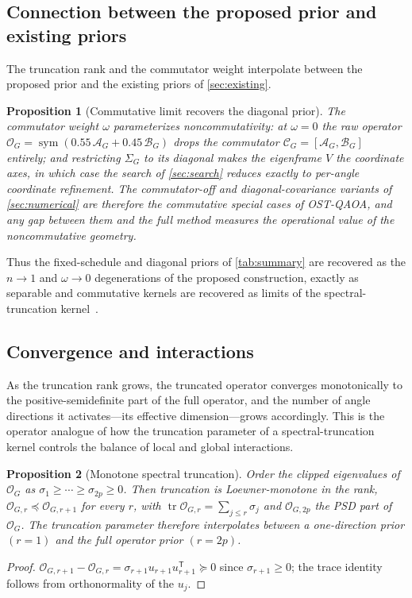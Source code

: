 \documentclass[aps,prresearch,reprint,amsmath,amssymb,floatfix,nofootinbib,superscriptaddress,longbibliography]{revtex4-2}
\newtheorem{proposition}{Proposition}
\theoremstyle{remark}
\newcommand{\OSTQAOA}{\textnormal{\textsc{OST-QAOA}}}
\newcommand{\calO}{\mathcal{O}}
\newcommand{\calA}{\mathcal{A}}
\newcommand{\calB}{\mathcal{B}}
\newcommand{\calC}{\mathcal{C}}
\begin{document}
\subsection{Connection between the proposed prior and existing priors}
\label{sec:connection}

The truncation rank and the commutator weight interpolate between the proposed
prior and the existing priors of \cref{sec:existing}.

\begin{proposition}[Commutative limit recovers the diagonal prior]
\label{prop:limit}
The commutator weight \(\omega\) parameterizes noncommutativity: at \(\omega=0\)
the raw operator \(\calO_G=\operatorname{sym}(0.55\,\calA_G+0.45\,\calB_G)\) drops
the commutator \(\calC_G=[\calA_G,\calB_G]\) entirely; and restricting
\(\Sigma_G\) to its diagonal makes the eigenframe \(V\) the coordinate axes, in
which case the search of \cref{sec:search} reduces exactly to per-angle
coordinate refinement.  The commutator-off and diagonal-covariance variants of
\cref{sec:numerical} are therefore the commutative special cases of \OSTQAOA{},
and any gap between them and the full method measures the operational value of the
noncommutative geometry.
\end{proposition}

Thus the fixed-schedule and diagonal priors of \cref{tab:summary} are recovered
as the \(n\to1\) and \(\omega\to0\) degenerations of the proposed construction,
exactly as separable and commutative kernels are recovered as limits of the
spectral-truncation kernel~\cite{hashimoto2024spectral}.

\subsection{Convergence and interactions}
\label{sec:convergence}

As the truncation rank grows, the truncated operator converges monotonically to
the positive-semidefinite part of the full operator, and the number of angle
directions it activates---its effective dimension---grows accordingly.  This is
the operator analogue of how the truncation parameter of a spectral-truncation
kernel controls the balance of local and global interactions.

\begin{proposition}[Monotone spectral truncation]
\label{prop:mono}
Order the clipped eigenvalues of \(\calO_G\) as
\(\sigma_1\ge\cdots\ge\sigma_{2p}\ge0\).  Then truncation is Loewner-monotone in
the rank, \(\calO_{G,r}\preceq\calO_{G,r+1}\) for every \(r\), with
\(\operatorname{tr}\calO_{G,r}=\sum_{j\le r}\sigma_j\) and \(\calO_{G,2p}\) the
PSD part of \(\calO_G\).  The truncation parameter therefore interpolates between
a one-direction prior \((r{=}1)\) and the full operator prior \((r{=}2p)\).
\end{proposition}
\begin{proof}
\(\calO_{G,r+1}-\calO_{G,r}=\sigma_{r+1}u_{r+1}u_{r+1}^{\mathsf T}\succeq0\) since
\(\sigma_{r+1}\ge0\); the trace identity follows from orthonormality of the
\(u_j\).
\end{proof}
\end{document}
